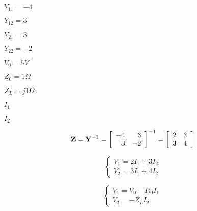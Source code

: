{\newpage\clearpage
{}%
$Y_{11}=-4$%
\lthtmlinlinemathZ
\lthtmlcheckvsize\clearpage}

{\newpage\clearpage
{}%
$Y_{12}=3$%
\lthtmlinlinemathZ
\lthtmlcheckvsize\clearpage}

{\newpage\clearpage
{}%
$Y_{21}=3$%
\lthtmlinlinemathZ
\lthtmlcheckvsize\clearpage}

{\newpage\clearpage
{}%
$Y_{22}=-2$%
\lthtmlinlinemathZ
\lthtmlcheckvsize\clearpage}

{\newpage\clearpage
{}%
$V_0=5V$%
\lthtmlinlinemathZ
\lthtmlcheckvsize\clearpage}

{\newpage\clearpage
{}%
$Z_0=1\Omega$%
\lthtmlinlinemathZ
\lthtmlcheckvsize\clearpage}

{\newpage\clearpage
{}%
$Z_L=j1\Omega$%
\lthtmlinlinemathZ
\lthtmlcheckvsize\clearpage}

{\newpage\clearpage
{}%
$I_1$%
\lthtmlinlinemathZ
\lthtmlcheckvsize\clearpage}

{\newpage\clearpage
{}%
$I_2$%
\lthtmlinlinemathZ
\lthtmlcheckvsize\clearpage}

{\newpage\clearpage
{}%
\begin{displaymath} {\bf Z}={\bf Y}^{-1}=\left[ \begin{array}{rr}-4 & 3 \\3 & -2\end{array} \right]^{-1}
    =\left[ \begin{array}{rr}2 & 3 \\3 & 4\end{array} \right] \end{displaymath}%
\lthtmldisplayZ
\lthtmlcheckvsize\clearpage}

{\newpage\clearpage
{}%
\begin{displaymath} \left\{ \begin{array}{l} V_1=2I_1+3I_2 \\V_2=3I_1+4I_2 \end{array} \right. \end{displaymath}%
\lthtmldisplayZ
\lthtmlcheckvsize\clearpage}

{\newpage\clearpage
{}%
\begin{displaymath} \left\{ \begin{array}{l} V_1=V_0-R_0I_1 \\V_2=-Z_L I_2 \end{array} \right. \end{displaymath}%
\lthtmldisplayZ
\lthtmlcheckvsize\clearpage}

